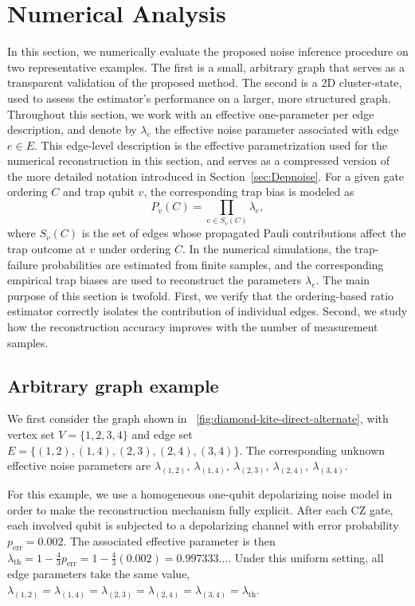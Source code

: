 \section{Numerical Analysis}

In this section, we numerically evaluate the proposed noise inference procedure on two representative examples. The first is a small, arbitrary graph that serves as a transparent validation of the proposed method. The second is a 2D cluster-state, used to assess the estimator's performance on a larger, more structured graph. Throughout this section, we work with an effective one-parameter per edge description, and denote by $\lambda_{e}$ the effective noise parameter associated with edge $e\in E$. This edge-level description is the effective parametrization used for the numerical reconstruction in this section, and serves as a compressed version of the more detailed notation introduced in Section~\ref{sec:Depnoise}. For a given gate ordering $C$ and trap qubit $v$, the corresponding trap bias is modeled as
\begin{equation}
	P_v(C)=\prod_{e\in S_v(C)} \lambda_e,
\end{equation}
where $S_v(C)$ is the set of edges whose propagated Pauli contributions affect the trap outcome at $v$ under ordering $C$. In the numerical simulations, the trap-failure probabilities are estimated from finite samples, and the corresponding empirical trap biases are used to reconstruct the parameters $\lambda_{e}$. The main purpose of this section is twofold. First, we verify that the ordering-based ratio estimator correctly isolates the contribution of individual edges. Second, we study how the reconstruction accuracy improves with the number of measurement samples.

\subsection{Arbitrary graph example}

We first consider the graph shown in ~\cref{fig:diamond-kite-direct-alternate}, with vertex set $V=\{1,2,3,4\}$ and edge set $E=\{(1,2),(1,4),(2,3),(2,4),(3,4)\}$. The corresponding unknown effective noise parameters are $\lambda_{(1,2)},\ \lambda_{(1,4)},\ \lambda_{(2,3)},\ \lambda_{(2,4)},\ \lambda_{(3,4)}$.




For this example, we use a homogeneous one-qubit depolarizing noise model in order to make the reconstruction mechanism fully explicit. After each $\mathrm{CZ}$ gate, each involved qubit is subjected to a depolarizing channel with error probability $p_{\mathrm{err}}=0.002$. The associated effective parameter is then
$\lambda_{\mathrm{th}}=1-\frac{4}{3}p_{\mathrm{err}}=1-\frac{4}{3}(0.002)=0.997333\ldots$. Under this uniform setting, all edge parameters take the same value, $\lambda_{(1,2)}=\lambda_{(1,4)}=\lambda_{(2,3)}=\lambda_{(2,4)}=\lambda_{(3,4)}=\lambda_{\mathrm{th}}$.


